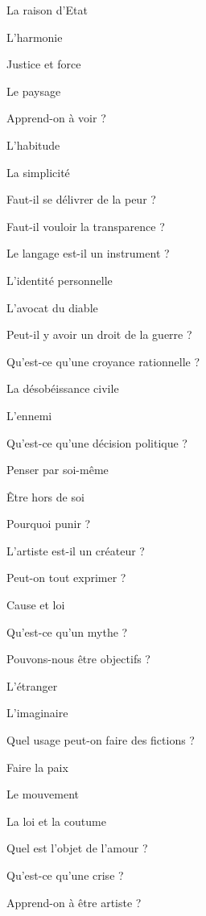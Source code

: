 \documentclass[a4paper,12pt]{article}
\begin{document}
\begin{multicols}{2}
\noindent La raison d’Etat \par
\noindent L’harmonie \par
\noindent Justice et force \par
\noindent Le paysage \par
\noindent Apprend-on à voir ? \par
\noindent L’habitude \par
\noindent La simplicité \par
\noindent Faut-il se délivrer de la peur ? \par
\noindent Faut-il vouloir la transparence ? \par
\noindent Le langage est-il un instrument ? \par
\noindent L’identité personnelle \par
\noindent L’avocat du diable \par
\noindent Peut-il y avoir un droit de la guerre ? \par
\noindent Qu’est-ce qu’une croyance rationnelle ? \par
\noindent La désobéissance civile \par
\noindent L’ennemi \par
\noindent Qu’est-ce qu’une décision politique ? \par
\noindent Penser par soi-même \par
\noindent Être hors de soi \par
\noindent Pourquoi punir ? \par
\noindent L’artiste est-il un créateur ? \par
\noindent Peut-on tout exprimer ? \par
\noindent Cause et loi \par
\noindent Qu’est-ce qu’un mythe ? \par
\noindent Pouvons-nous être objectifs ? \par
\noindent L’étranger \par
\noindent L’imaginaire \par
\noindent Quel usage peut-on faire des fictions ? \par
\noindent Faire la paix \par
\noindent Le mouvement \par
\noindent La loi et la coutume \par
\noindent Quel est l’objet de l’amour ? \par
\noindent Qu’est-ce qu’une crise ? \par
\noindent Apprend-on à être artiste ? \par

\end{multicols}
\end{document}
